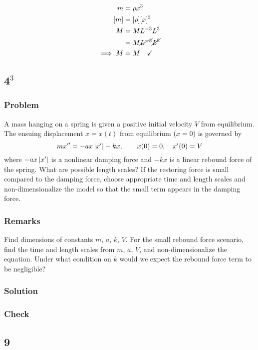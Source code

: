 \documentclass[12pt]{article}
\begin{document}
\begin{equation}
  \begin{aligned}
    m &= \rho x^3 \\
    [m] &= [\rho] [x]^3 \\
    M &= ML^{-3} L^{3} \\
    &= M\cancel{L^{-3}} \cancel{L^{3}} \\
    \implies M &= M \quad\checkmark
  \end{aligned}
\end{equation}

\subsection{4$^3$}
\subsubsection*{Problem}
A mass hanging on a spring is given a positive initial velocity $V$ from
equilibrium. The ensuing displacement $x=x(t)$ from equilibrium ($x=0$) is
governed by $$mx'' = -ax\left|{x'}\right|-kx, \qquad x(0) = 0,\quad x'(0) = V$$ where
$-ax\left|{x'}\right|$ is a nonlinear damping force and $-kx$ is a linear rebound force
of the spring. What are possible length scales? If the restoring force is small
compared to the damping force, choose appropriate time and length scales and
non-dimensionalize the model so that the small term appears in the damping
force.

\subsubsection*{Remarks}
Find dimensions of constants $m$, $a$, $k$, $V$. For the small rebound force
scenario, find the time and length scales from $m$, $a$, $V$, and
non-dimensionalize the equation. Under what condition on $k$ would we expect the
rebound force term to be negligible?

\subsubsection*{Solution}
\todo
\subsubsection*{Check}
\todo

\subsection{9}
\end{document}
